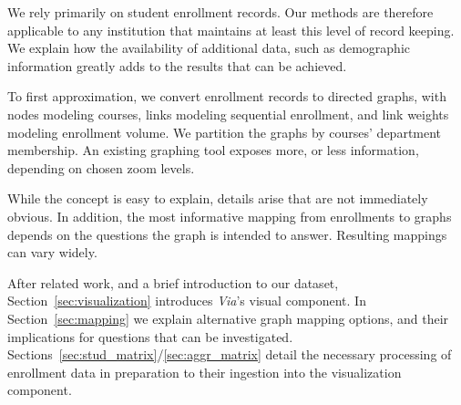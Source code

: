 We rely primarily on student enrollment records. Our methods are
therefore applicable to any institution that maintains at least this
level of record keeping. We explain how the availability of additional
data, such as demographic information greatly adds to the results that
can be achieved.

To first approximation, we convert enrollment records to directed
graphs, with nodes modeling courses, links modeling sequential
enrollment, and link weights modeling enrollment volume. We partition
the graphs by courses' department membership. An existing graphing
tool \cite{shannon2003cytoscape} exposes more, or less information,
depending on chosen zoom levels.

While the concept is easy to explain, details arise that are not
immediately obvious. In addition, the most informative mapping from
enrollments to graphs depends on the questions the graph is intended
to answer. Resulting mappings can vary widely.

After related work, and a brief introduction to our dataset,
Section~\ref{sec:visualization} introduces {\it Via}'s visual
component. In Section~\ref{sec:mapping} we explain alternative graph
mapping options, and their implications for questions that can be
investigated. Sections~\ref{sec:stud_matrix}/\ref{sec:aggr_matrix}
detail the necessary processing of enrollment data in preparation to
their ingestion into the visualization component.


